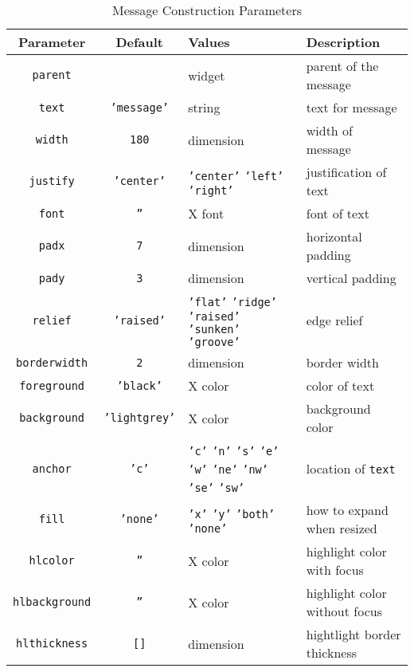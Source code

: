 \begin{table}[tbh]
{\small
\begin{center}
\begin{tabular}{|c|c|p{1.6in}|p{1.5in}|}
\hline
Parameter & Default & Values & Description \\
\hline
\hline
{\tt parent}		& 		& widget & parent of the message \\ \hline
{\tt text}		& {\tt 'message'}& string & text for message \\ \hline
{\tt width}		& {\tt 180}	& dimension & width of message\\ \hline
{\tt justify}		& {\tt 'center'}& {\tt 'center'} {\tt 'left'} {\tt 'right'} & justification of text \\ \hline
{\tt font}		& {\tt ''}	& X font & font of text \\ \hline
{\tt padx}		& {\tt 7}	& dimension & horizontal padding \\ \hline
{\tt pady}		& {\tt 3}	& dimension & vertical padding \\ \hline
{\tt relief}		& {\tt 'raised'}& {\tt 'flat'} {\tt 'ridge'} {\tt 'raised'} {\tt 'sunken'} {\tt 'groove'} & edge relief \\ \hline
{\tt borderwidth}	& {\tt 2}	& dimension & border width \\ \hline
{\tt foreground}	& {\tt 'black'}	& X color & color of text \\ \hline
{\tt background}	& {\tt 'lightgrey'}& X color & background color \\ \hline
{\tt anchor}            & {\tt 'c'}     & {\tt 'c'} {\tt 'n'} {\tt 's'} {\tt 'e'} {\tt 'w'} {\tt 'ne'} {\tt 'nw'} {\tt 'se'} {\tt 'sw'} & location of {\tt text} \\ \hline
{\tt fill}		& {\tt 'none'}	& {\tt 'x'} {\tt 'y'} {\tt 'both'} {\tt 'none'} & how to expand when resized \\ \hline
{\tt hlcolor}		& {\tt ''}	& X color & highlight color with focus \\ \hline
{\tt hlbackground}	& {\tt ''}	& X color & highlight color without focus \\ \hline
{\tt hlthickness}	& {\tt []}	& dimension & hightlight border thickness \\ \hline
\end{tabular}
\end{center}
}
\caption{ Message Construction Parameters }
\label{tkmessage-params}
\end{table}

